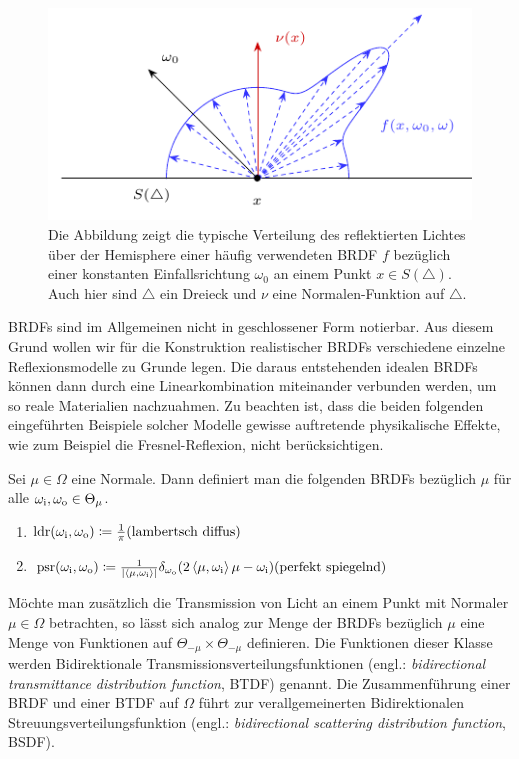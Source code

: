 		\begin{figure}
			\center
			\includegraphics{gg_fig/brdf_1.pdf}
			\caption{Die Abbildung zeigt die typische Verteilung des reflektierten Lichtes über der Hemisphere einer häufig verwendeten BRDF $f$ bezüglich einer konstanten Einfallsrichtung $\omega_0$ an einem Punkt $x\in S(\triangle)$. Auch hier sind $\triangle$ ein Dreieck und $\nu$ eine Normalen-Funktion auf $\triangle$.}
			\label{fig:brdf}
		\end{figure}

		BRDFs sind im Allgemeinen nicht in geschlossener Form notierbar.
		Aus diesem Grund wollen wir für die Konstruktion realistischer BRDFs verschiedene einzelne Reflexionsmodelle zu Grunde legen.
		Die daraus entstehenden idealen BRDFs können dann durch eine Linearkombination miteinander verbunden werden, um so reale Materialien nachzuahmen.
		Zu beachten ist, dass die beiden folgenden eingeführten Beispiele solcher Modelle gewisse auftretende physikalische Effekte, wie zum Beispiel die Fresnel-Reflexion, nicht berücksichtigen.
		\begin{definition}
			Sei $\mu\in\Omega$ eine Normale.
			Dann definiert man die folgenden BRDFs bezüglich $\mu$ für alle $\omega_{\mathrm{i}},\omega_{\mathrm{o}}\in\Theta_\mu$.
			\begin{enumerate}[label = \normalfont{(\roman*)}]
				\item $\m{ldr}(\omega_\m{i},\omega_\m{o}) \define \frac{1}{\pi} \hfill \text{(lambertsch diffus)}$
				\item $\m{psr}(\omega_\m{i},\omega_\m{o}) \define \frac{1}{\abs{\dotp{\mu}{\omega_\m{i}}}} \delta_{\omega_\m{o}}(2\dotp{\mu}{\omega_\m{i}}\mu - \omega_\m{i}) \hfill \text{(perfekt spiegelnd)}$
			\end{enumerate}
		\end{definition}

		Möchte man zusätzlich die Transmission von Licht an einem Punkt mit Normaler $\mu\in\Omega$ betrachten, so lässt sich analog zur Menge der BRDFs bezüglich $\mu$ eine Menge von Funktionen auf $\Theta_{-\mu}\times\Theta_{-\mu}$ definieren.
		Die Funktionen dieser Klasse werden Bidirektionale Transmissionsverteilungsfunktionen (engl.: \textit{bidirectional transmittance distribution function}, BTDF) genannt.
		Die Zusammenführung einer BRDF und einer BTDF auf $\Omega$ führt zur verallgemeinerten Bidirektionalen Streuungsverteilungsfunktion (engl.: \textit{bidirectional scattering distribution function}, BSDF).


